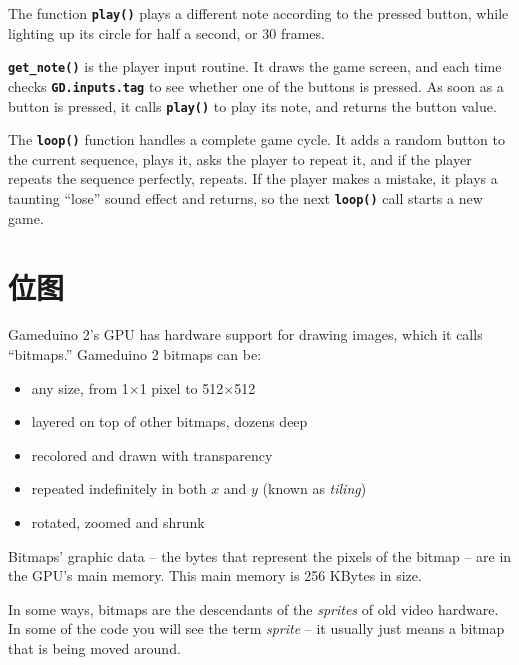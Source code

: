 \documentclass[10pt]{book}
\newcommand{\mach}[1]{\texttt{\textbf{#1}}}
\newcommand{\term}[1]{\emph{#1}\index{#1}}
\begin{document}
\begin{CJK}{UTF8}{gkai}
\newpage
{}

The function \mach{play()} plays a different note according to the pressed button,
while lighting up its circle for half a second, or 30 frames.


\mach{get\_note()} is the player input routine.
It draws the game screen, and each time checks
\mach{GD.inputs.tag} to see whether one of the buttons is pressed.
As soon as a button is pressed, it calls \mach{play()} to play its note, and returns the button value.


The \mach{loop()} function
handles a complete game cycle.
It adds a random button to the current sequence, plays it, asks the player to repeat it,
and if the player repeats the sequence perfectly, repeats.
If the player makes a mistake, it plays a taunting ``lose'' sound effect and returns, so the next
\mach{loop()} call starts a new game.


\chapter{位图}

Gameduino 2's GPU has hardware support for drawing images,
which it calls ``bitmaps.''
Gameduino 2 bitmaps can be:

\begin{itemize}
\item any size, from 1$\times$1 pixel to 512$\times$512
\item layered on top of other bitmaps, dozens deep
\item recolored and drawn with transparency
\item repeated indefinitely in both $x$ and $y$ (known as \term{tiling})
\item rotated, zoomed and shrunk
\end{itemize}

Bitmaps' graphic data -- the bytes that represent the pixels of the bitmap -- are in
the GPU's main memory. This main memory is 256 KBytes in size.

In some ways, bitmaps are the descendants of the \term{sprites} of old video hardware.
In some of the code you will see the term \textit{sprite} --
it usually just means a bitmap that is being moved around.


\end{CJK}
\end{document}
